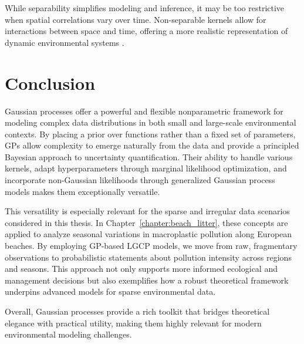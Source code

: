 While separability simplifies modeling and inference, it may be too restrictive when spatial correlations vary over time. Non-separable kernels allow for interactions between space and time, offering a more realistic representation of dynamic environmental systems \cite[e.g][]{datta_nonseparable_2016}.

\section{Conclusion}\label{sec:gp:conclusion}

Gaussian processes offer a powerful and flexible nonparametric framework for modeling complex data distributions in both small and large-scale environmental contexts. By placing a prior over functions rather than a fixed set of parameters, GPs allow complexity to emerge naturally from the data and provide a principled Bayesian approach to uncertainty quantification. Their ability to handle various kernels, adapt hyperparameters through marginal likelihood optimization, and incorporate non-Gaussian likelihoods through generalized Gaussian process models makes them exceptionally versatile.

This versatility is especially relevant for the sparse and irregular data scenarios considered in this thesis. In Chapter~\ref{chapter:beach_litter}, these concepts are applied to analyze seasonal variations in macroplastic pollution along European beaches. By employing GP-based LGCP models, we move from raw, fragmentary observations to probabilistic statements about pollution intensity across regions and seasons. This approach not only supports more informed ecological and management decisions but also exemplifies how a robust theoretical framework underpins advanced models for sparse environmental data. 

Overall, Gaussian processes provide a rich toolkit that bridges theoretical elegance with practical utility, making them highly relevant for modern environmental modeling challenges.


\clearpage
